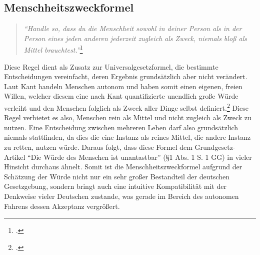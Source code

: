 \documentclass[a4paper, 12pt, openany]{book}
\begin{document}
            \subsection{Menschheitszweckformel}
            \begin{quote}
                \centering
                \textit{\enquote{Handle so, dass du die Menschheit sowohl in deiner Person als in der Person eines jeden anderen jederzeit zugleich als Zweck, niemals bloß als Mittel brauchtest.}}\footcite[53]{kirchmann1870grundlegung}
            \end{quote}
            Diese Regel dient als Zusatz zur Universalgesetzformel, die bestimmte Entscheidungen vereinfacht, deren Ergebnis grundsätzlich aber nicht verändert. Laut Kant handeln Menschen autonom und haben somit einen eigenen, freien Willen, welcher diesem eine nach Kant quantifizierte unendlich große Würde verleiht und den Menschen folglich als Zweck aller Dinge selbst definiert.\footcite[53]{kirchmann1870grundlegung} Diese Regel verbietet es also, Menschen rein als Mittel und nicht zugleich als Zweck zu nutzen. Eine Entscheidung zwischen mehreren Leben darf also grundsätzlich niemals stattfinden, da dies die eine Instanz als reines Mittel, die andere Instanz zu retten, nutzen würde. Daraus folgt, dass diese Formel dem Grundgesetz-Artikel \enquote{Die Würde des Menschen ist unantastbar} (§1 Abs. 1 S. 1 GG) in vieler Hinsicht durchaus ähnelt. Somit ist die Menschheitszweckformel aufgrund der Schätzung der Würde nicht nur ein sehr großer Bestandteil der deutschen Gesetzgebung, sondern bringt auch eine intuitive Kompatibilität mit der Denkweise vieler Deutschen zustande, was gerade im Bereich des autonomen Fahrens dessen Akzeptanz vergrößert.
                
\end{document}
